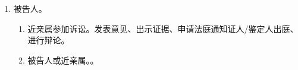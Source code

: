 \begin{enumerate}
\begin{enumerate}
\begin{enumerate}
\begin{enumerate}
                          \item 被告有权委托辩护人，近亲属可以代为委托辩护人。
                          \item 没有辩护人，则应当通知、法律援助、指派、辩护人。
                          \item 有理 1 次有人辩。
                        \end{enumerate}
                \end{enumerate}
          \item {}。结局都一样，按普通程序。
                \begin{enumerate}
                  \item 审理中 \yjt 按普通程序、重新审理。
                  \item 裁判生效后/交付执行前 \yjt {}。
                \end{enumerate}
          \item {}。
                \begin{enumerate}
                  \item 一审、二审。终止审理，If(无罪)，缺席判决，还人清白。
                  \item 再审。缺席判决，依法作出相应的裁判。
                \end{enumerate}
        \end{enumerate}
  \item 被告人。
        \begin{enumerate}
          \item 近亲属参加诉讼。发表意见、出示证据、申请法庭通知证人/鉴定人出庭、进行辩论。
          \item 被告人或近亲属。。
        \end{enumerate}
\end{enumerate}
